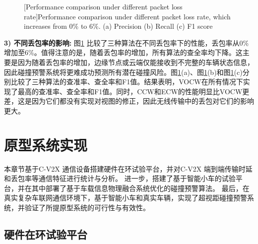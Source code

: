 \begin{figure}[h]
     \centering
     [Performance comparison under different packet loss rate]{Performance comparison under different packet loss rate, which increases from 0\% to 6\%. (a) Precision (b) Recall (c) F1 score}
     \label{fig 5-6}
\end{figure}

\textbf{3) 不同丢包率的影响:}
图\ref{fig 5-6} 比较了三种算法在不同丢包率下的性能，丢包率从0\%增加至6\%。值得注意的是，随着丢包率的增加，所有算法的查全率均下降。这主要是因为随着丢包率的增加，边缘节点或云端仅能接收到不完整的车辆状态信息，因此碰撞预警系统将更难成功预测所有潜在碰撞风险。图\ref{fig 5-6}(a)、图\ref{fig 5-6}(b)和图\ref{fig 5-6}(c)分别比较了三种算法的查准率、查全率和F1值。结果表明，VOCW在所有情况下实现了最高的查准率、查全率和F1值。同时，CCW和ECW的性能明显比VOCW更差，这是因为它们都没有实现对视图的修正，因此无线传输中的丢包对它们的影响更大。

\section[\hspace{-2pt}原型系统实现]{{ \hspace{-8pt}原型系统实现}}\label{section 5-5}

本章节基于C-V2X 通信设备搭建硬件在环试验平台，并对C-V2X 端到端传输时延和丢包率等通信特征进行统计与分析。
进一步，搭建了基于智能小车的试验平台，并在其中部署了基于车载信息物理融合系统优化的碰撞预警算法。
最后，在真实复杂车联网通信环境下，基于智能小车和真实车辆，实现了超视距碰撞预警系统，并验证了所提原型系统的可行性与有效性。

\subsection[\hspace{-2pt}硬件在环试验平台]{{ \hspace{-8pt}硬件在环试验平台}}

